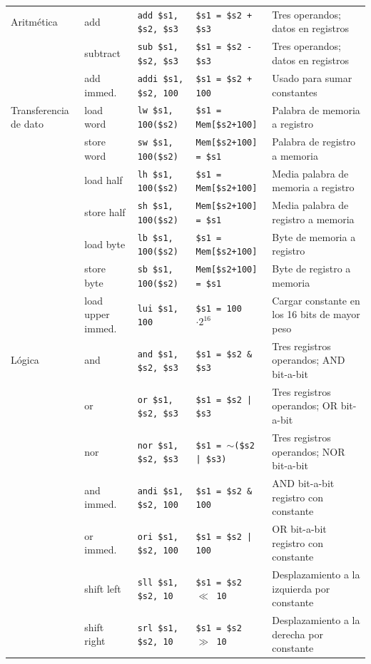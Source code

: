 \documentclass[12pt,a4paper]{article}
\begin{document}
\begin{xltabular}{\textwidth}{>{\raggedright\arraybackslash}p{2.2cm} >{\raggedright\arraybackslash}p{2.2cm} >{\raggedright\arraybackslash}p{3cm} >{\raggedright\arraybackslash}p{3.5cm} X}
			Aritmética 
			& add & \texttt{add \$s1, \$s2, \$s3} & \texttt{\$s1 = \$s2 + \$s3} & Tres operandos; datos en registros \\
			& subtract & \texttt{sub \$s1, \$s2, \$s3} & \texttt{\$s1 = \$s2 - \$s3} & Tres operandos; datos en registros \\
			& add immed. & \texttt{addi \$s1, \$s2, 100} & \texttt{\$s1 = \$s2 + 100} & Usado para sumar constantes \\
			\midrule
			Transferencia de dato 
			& load word & \texttt{lw \$s1, 100(\$s2)} & \texttt{\$s1 = Mem[\$s2+100]} & Palabra de memoria a registro \\
			& store word & \texttt{sw \$s1, 100(\$s2)} & \texttt{Mem[\$s2+100] = \$s1} & Palabra de registro a memoria \\
			& load half & \texttt{lh \$s1, 100(\$s2)} & \texttt{\$s1 = Mem[\$s2+100]} & Media palabra de memoria a registro \\
			& store half & \texttt{sh \$s1, 100(\$s2)} & \texttt{Mem[\$s2+100] = \$s1} & Media palabra de registro a memoria \\
			& load byte & \texttt{lb \$s1, 100(\$s2)} & \texttt{\$s1 = Mem[\$s2+100]} & Byte de memoria a registro \\
			& store byte & \texttt{sb \$s1, 100(\$s2)} & \texttt{Mem[\$s2+100] = \$s1} & Byte de registro a memoria \\
			& load upper immed. & \texttt{lui \$s1, 100} & \texttt{\$s1 = 100 $\cdot 2^{16}$} & Cargar constante en los 16 bits de mayor peso \\
			\midrule
			Lógica 
			& and & \texttt{and \$s1, \$s2, \$s3} & \texttt{\$s1 = \$s2 \& \$s3} & Tres registros operandos; AND bit-a-bit \\
			& or & \texttt{or \$s1, \$s2, \$s3} & \texttt{\$s1 = \$s2 | \$s3} & Tres registros operandos; OR bit-a-bit \\
			& nor & \texttt{nor \$s1, \$s2, \$s3} & \texttt{\$s1 = $\sim$(\$s2 | \$s3)} & Tres registros operandos; NOR bit-a-bit \\
			& and immed. & \texttt{andi \$s1, \$s2, 100} & \texttt{\$s1 = \$s2 \& 100} & AND bit-a-bit registro con constante \\
			& or immed. & \texttt{ori \$s1, \$s2, 100} & \texttt{\$s1 = \$s2 | 100} & OR bit-a-bit registro con constante \\
			& shift left & \texttt{sll \$s1, \$s2, 10} & \texttt{\$s1 = \$s2 $\ll$ 10} & Desplazamiento a la izquierda por constante \\
			& shift right & \texttt{srl \$s1, \$s2, 10} & \texttt{\$s1 = \$s2 $\gg$ 10} & Desplazamiento a la derecha por constante \\

\end{xltabular}
\end{document}
